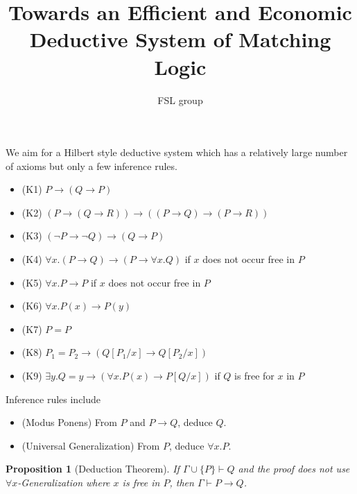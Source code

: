 \documentclass{article}
\title{Towards an Efficient and Economic Deductive System of Matching Logic}
\author{FSL group}
\newtheorem{prop}{Proposition}
\begin{document}
\maketitle
We aim for a Hilbert style deductive system which has a relatively large number of axioms but only a few inference rules. 

\begin{itemize}
\item (K1) $P \to (Q \to P)$
\item (K2) $(P \to (Q \to R)) \to ((P \to Q) \to (P \to R))$
\item (K3) $(\neg P \to \neg Q) \to (Q \to P)$
\item (K4) $\forall x . (P \to Q) \to (P \to \forall x . Q)$ if $x$ does not occur free in $P$
\item (K5) $\forall x . P \to P$ if $x$ does not occur free in $P$
\item (K6) $\forall x . P(x) \to P(y)$
\item (K7) $P = P$
\item (K8) $P_1 = P_2 \to (Q[P_1/x] \to Q[P_2/x])$
\item (K9) $\exists y . Q = y \to (\forall x . P(x) \to P[Q/x])$ if $Q$ is free for $x$ in $P$
\end{itemize}

Inference rules include
\begin{itemize}
\item (Modus Ponens) From $P$ and $P \to Q$, deduce $Q$.
\item (Universal Generalization) From $P$, deduce $\forall x . P$. 
\end{itemize}

\begin{prop}[Deduction Theorem]
If $\Gamma \cup \{P\} \vdash Q$ and the proof does not use $\forall x$-Generalization where $x$ is free in $P$, then $\Gamma \vdash P \to Q$. 
\end{prop}
\end{document}

